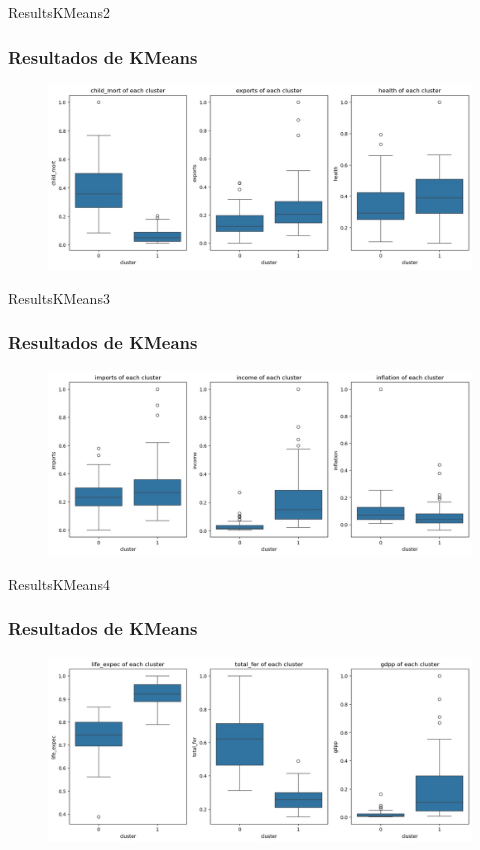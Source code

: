 \documentclass{beamer}
\begin{document}
\begin{frame}{ResultsKMeans2}
  \frametitle{Resultados de KMeans}
  \begin{figure}
    \includegraphics[width=\textwidth]{../images/kmeans/features-dist-1.jpg}
  \end{figure}
\end{frame}

\begin{frame}{ResultsKMeans3}
  \frametitle{Resultados de KMeans}
  \begin{figure}
    \includegraphics[width=\textwidth]{../images/kmeans/features-dist-2.jpg}
  \end{figure}
\end{frame}

\begin{frame}{ResultsKMeans4}
  \frametitle{Resultados de KMeans}
  \begin{figure}
    \includegraphics[width=\textwidth]{../images/kmeans/features-dist-3.jpg}
  \end{figure}
\end{frame}
\end{document}
